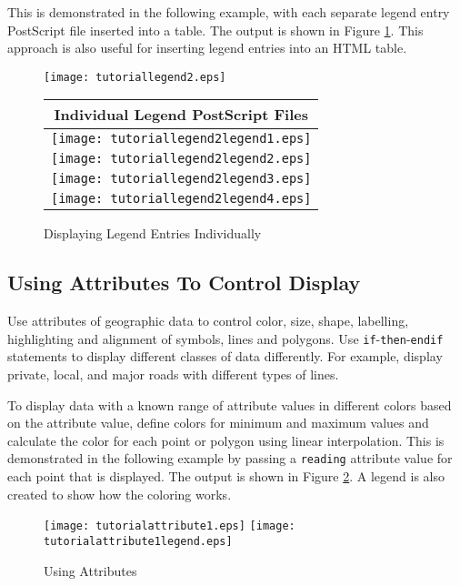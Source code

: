 This is demonstrated in the following example, with each separate legend entry
PostScript file inserted into a table.  The output is shown in Figure
\ref{tutoriallegend2}.  This approach is also useful for inserting legend
entries into an HTML table.



\begin{figure}[htb]
\texttt{[image: tutoriallegend2.eps]}

\begin{tabular}{|c|}
\hline
Individual Legend PostScript Files \\
\hline
\texttt{[image: tutoriallegend2legend1.eps]} \\
\hline
\texttt{[image: tutoriallegend2legend2.eps]} \\
\hline
\texttt{[image: tutoriallegend2legend3.eps]} \\
\hline
\texttt{[image: tutoriallegend2legend4.eps]} \\
\hline
\end{tabular}

\caption{Displaying Legend Entries Individually}
\label{tutoriallegend2}
\end{figure}

\subsection{Using Attributes To Control Display}

Use attributes of geographic data to control
color, size, shape, labelling, highlighting and alignment of symbols, lines
and polygons.
Use \texttt{if}-\texttt{then}-\texttt{endif}
statements to display different classes of data
differently.  For example, display private, local, and major roads
with different types of lines.

To display data with a known range of attribute values in different
colors based on the attribute value, define colors for minimum and
maximum values and calculate the color for each point or polygon
using linear interpolation.  This is demonstrated in the following
example by passing a \texttt{reading} attribute value for each point
that is displayed.  The output is shown in Figure \ref{tutorialattribute1}.
A legend is also created to show how the coloring works.



\begin{figure}[htb]
\texttt{[image: tutorialattribute1.eps]}
\texttt{[image: tutorialattribute1legend.eps]}
\caption{Using Attributes}
\label{tutorialattribute1}
\end{figure}

